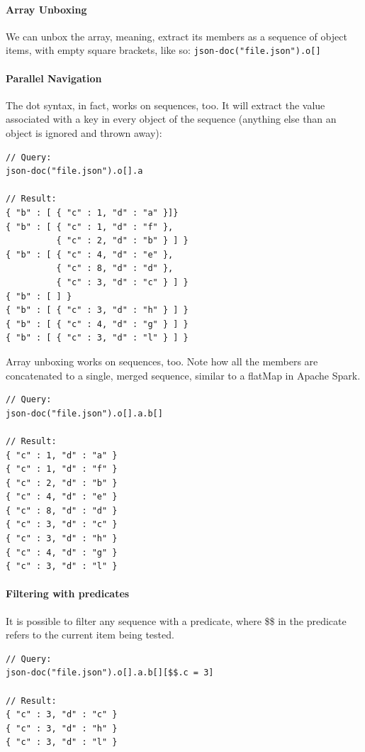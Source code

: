 \paragraph{Array Unboxing}
We can unbox the array, meaning, extract its members as a sequence of object items, with empty square brackets, like so: \texttt{json-doc("file.json").o[]}

\paragraph{Parallel Navigation}
The dot syntax, in fact, works on sequences, too. It will extract the value associated with a key in every object of the sequence (anything else than an object is ignored and thrown away):

\begin{lstlisting}[style=json]
// Query:
json-doc("file.json").o[].a

// Result:
{ "b" : [ { "c" : 1, "d" : "a" }]}
{ "b" : [ { "c" : 1, "d" : "f" },
          { "c" : 2, "d" : "b" } ] }
{ "b" : [ { "c" : 4, "d" : "e" },
          { "c" : 8, "d" : "d" },
          { "c" : 3, "d" : "c" } ] }
{ "b" : [ ] }
{ "b" : [ { "c" : 3, "d" : "h" } ] }
{ "b" : [ { "c" : 4, "d" : "g" } ] }
{ "b" : [ { "c" : 3, "d" : "l" } ] }
\end{lstlisting}

Array unboxing works on sequences, too. Note how all the members are concatenated to a single, merged sequence, similar to a flatMap in Apache Spark.

\begin{lstlisting}[style=json]
// Query:
json-doc("file.json").o[].a.b[]

// Result:
{ "c" : 1, "d" : "a" }
{ "c" : 1, "d" : "f" }
{ "c" : 2, "d" : "b" }
{ "c" : 4, "d" : "e" }
{ "c" : 8, "d" : "d" }
{ "c" : 3, "d" : "c" }
{ "c" : 3, "d" : "h" }
{ "c" : 4, "d" : "g" }
{ "c" : 3, "d" : "l" }
\end{lstlisting}

\paragraph{Filtering with predicates}
It is possible to filter any sequence with a predicate, where \$\$ in the predicate refers to the current item being tested.

\begin{lstlisting}[style=json]
// Query:
json-doc("file.json").o[].a.b[][$$.c = 3]

// Result:
{ "c" : 3, "d" : "c" }
{ "c" : 3, "d" : "h" }
{ "c" : 3, "d" : "l" }
\end{lstlisting}

